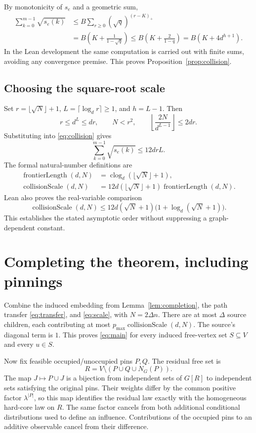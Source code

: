 \documentclass[11pt]{article}
\theoremstyle{definition}
\newcommand{\clog}{\operatorname{clog}}
\begin{document}
By monotonicity of $s_e$ and a geometric sum,
\begin{align*}
 \sum_{k=0}^{m-1}\sqrt{s_e(k)}
 &\le B\sum_{r\ge0}(\sqrt q)^{(r-K)_+}\\
 &=B\left(K+\frac{1}{1-\sqrt q}\right)
 \le B\left(K+\frac{2}{1-q}\right)
 =B\left(K+4d^{h+1}\right).
\end{align*}
In the Lean development the same computation is carried out with finite
sums, avoiding any convergence premise. This proves
Proposition~\ref{prop:collision}.

\subsection{Choosing the square-root scale}

Set $r=\lfloor\sqrt N\rfloor+1$,
$L=\lceil\log_d r\rceil\ge1$, and $h=L-1$. Then
\[
 r\le d^L\le dr,\qquad N<r^2,\qquad
 \left\lfloor\frac{2N}{d^{L-1}}\right\rfloor\le2dr.
\]
Substituting into \eqref{eq:collision} gives
\begin{equation}\label{eq:scale}
 \sum_{k=0}^{m-1}\sqrt{s_e(k)}\le12drL.
\end{equation}
The formal natural-number definitions are
\begin{align*}
 \operatorname{frontierLength}(d,N)&=\clog_d(\lfloor\sqrt N\rfloor+1),\\
 \operatorname{collisionScale}(d,N)&=12d(\lfloor\sqrt N\rfloor+1)
 \operatorname{frontierLength}(d,N).
\end{align*}
Lean also proves the real-variable comparison
\[
 \operatorname{collisionScale}(d,N)
 \le12d(\sqrt N+1)\bigl(1+\log_d(\sqrt N+1)\bigr).
\]
This establishes the stated asymptotic order without suppressing a
graph-dependent constant.

\section{Completing the theorem, including pinnings}

Combine the induced embedding from Lemma~\ref{lem:completion}, the path
transfer \eqref{eq:transfer}, and \eqref{eq:scale}, with $N=2\Delta n$.
There are at most $\Delta$ source children, each contributing at most
$p_{\max}\operatorname{collisionScale}(d,N)$. The source's diagonal term
is $1$. This proves \eqref{eq:main} for every induced free-vertex set
$S\subseteq V$ and every $u\in S$.

Now fix feasible occupied/unoccupied pins $P,Q$. The residual free set is
\[
 R=V\setminus(P\cup Q\cup N_G(P)).
\]
The map $J\mapsto P\cup J$ is a bijection from independent sets of $G[R]$
to independent sets satisfying the original pins. Their weights differ by
the common positive factor $\lambda^{|P|}$, so this map identifies the
residual law exactly with the homogeneous hard-core law on $R$.
The same factor cancels from both additional conditional distributions
used to define an influence. Contributions of the occupied pins to an
additive observable cancel from their difference.
\end{document}
